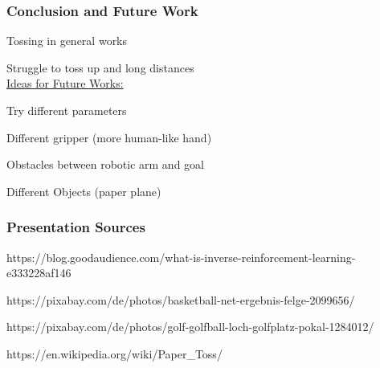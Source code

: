 
 



\begin{frame}
	\frametitle{Conclusion and Future Work}	
	\vspace{1cm}
	
    \begin{PraesentationAufzaehlung}
    	\item Tossing in general works
    	\item Struggle to toss up and long distances \\
        \vspace{\baselineskip}
    	\underline{Ideas for Future Works:}
    	\item Try different parameters
    	\item Different gripper (more human-like hand)
    	\item Obstacles between robotic arm and goal
    	\item Different Objects (paper plane)


    	
    \end{PraesentationAufzaehlung}
    
	
\end{frame}
\clearpage













\begin{frame}
	\frametitle{Presentation Sources}	
	\vspace{1cm}
	
	https://blog.goodaudience.com/what-is-inverse-reinforcement-learning-e333228af146
	
	https://pixabay.com/de/photos/basketball-net-ergebnis-felge-2099656/
	
	https://pixabay.com/de/photos/golf-golfball-loch-golfplatz-pokal-1284012/
	
	https://en.wikipedia.org/wiki/Paper\_Toss/
	
	
\end{frame}
\clearpage




